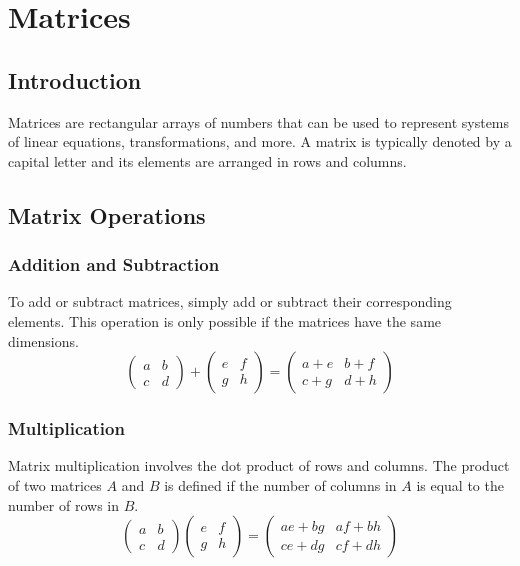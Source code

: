 \documentclass[a4paper,twoside,11pt]{book}
\newcommand{\chaptercolor}{}
\newcommand{\chaptercolors}[1]{%
  \ifcase#1%
    \renewcommand{\chaptercolor}{cyan!20!white}\or %
    \renewcommand{\chaptercolor}{red!20!white}\or  %
    \renewcommand{\chaptercolor}{yellow!20!white}\or %
    \renewcommand{\chaptercolor}{brown!20!white}  %
  \else
    \renewcommand{\chaptercolor}{white}
  \fi
}
\begin{document}
\chapter{Matrices}
\chaptercolors{2}
\section{Introduction}
Matrices are rectangular arrays of numbers that can be used to represent systems of linear equations, transformations, and more. A matrix is typically denoted by a capital letter and its elements are arranged in rows and columns.

\section{Matrix Operations}
\subsection{Addition and Subtraction}
To add or subtract matrices, simply add or subtract their corresponding elements. This operation is only possible if the matrices have the same dimensions.
\[
\begin{pmatrix}
a & b \\
c & d
\end{pmatrix}
+
\begin{pmatrix}
e & f \\
g & h
\end{pmatrix}
=
\begin{pmatrix}
a+e & b+f \\
c+g & d+h
\end{pmatrix}
\]

\subsection{Multiplication}
Matrix multiplication involves the dot product of rows and columns. The product of two matrices \(A\) and \(B\) is defined if the number of columns in \(A\) is equal to the number of rows in \(B\).
\[
\begin{pmatrix}
a & b \\
c & d
\end{pmatrix}
\begin{pmatrix}
e & f \\
g & h
\end{pmatrix}
=
\begin{pmatrix}
ae+bg & af+bh \\
ce+dg & cf+dh
\end{pmatrix}
\]
\end{document}
